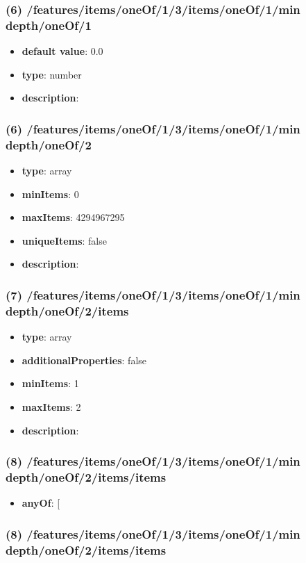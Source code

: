 \subsubsection{(6) /features/items/oneOf/1/3/items/oneOf/1/min depth/oneOf/1}
\begin{itemize}[leftmargin=6em]\item {\bf default value}: 0.0
\item {\bf type}: number
\item {\bf description}: 
\end{itemize}\subsubsection{(6) /features/items/oneOf/1/3/items/oneOf/1/min depth/oneOf/2}
\begin{itemize}[leftmargin=6em]\item {\bf type}: array
\item {\bf minItems}: 0
\item {\bf maxItems}: 4294967295
\item {\bf uniqueItems}: false
\item {\bf description}: 
\end{itemize}\subsubsection{(7) /features/items/oneOf/1/3/items/oneOf/1/min depth/oneOf/2/items}
\begin{itemize}[leftmargin=7em]\item {\bf type}: array
\item {\bf additionalProperties}: false
\item {\bf minItems}: 1
\item {\bf maxItems}: 2
\item {\bf description}: 
\end{itemize}\subsubsection{(8) /features/items/oneOf/1/3/items/oneOf/1/min depth/oneOf/2/items/items}
\begin{itemize}[leftmargin=8em]\item {\bf anyOf}: [\end{itemize}\subsubsection{(8) /features/items/oneOf/1/3/items/oneOf/1/min depth/oneOf/2/items/items}
